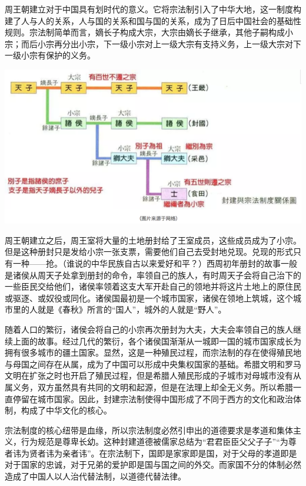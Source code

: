 \documentclass[
]{book}
\begin{document}
周王朝建立对于中国具有划时代的意义。它将宗法制引入了中华大地，这一制度构建了人与人的关系，人与国的关系和国与国的关系，成为了日后中国社会的基础性规则。宗法制简单而言，嫡长子构成大宗，大宗由嫡长子继承，其他子嗣构成小宗；而后小宗再分出小宗，下一级小宗对上一级大宗有支持义务，上一级大宗对下一级小宗有保护的义务。

\includegraphics[width=8.33in]{images/gx2}

周王朝建立之后，周王室将大量的土地册封给了王室成员，这些成员成为了小宗。但是这种册封只是发给小宗一张支票，需要他们自己去受封地兑现。兑现的形式只有一种------抢。（谁说的中华民族自古以来爱好和平？）西周初年册封的故事一般是诸侯从周天子处拿到册封的命令，率领自己的族人，有时周天子会将自己治下的一些臣民交给他们，诸侯率领着这支大军开赴自己的领地并将这片土地上的原住民或驱逐、或奴役或同化。诸侯国最初是一个城市国家，诸侯在领地上筑城，这个城市里的人就是《春秋》所言的``国人''，城外的人就是``野人''。

随着人口的繁衍，诸侯会将自己的小宗再次册封为大夫，大夫会率领自己的族人继续上面的故事。经过几代的繁衍，各个诸侯国渐渐从一城即一国的城市国家成长为拥有很多城市的疆土国家。显然，这是一种殖民过程，而宗法制的存在使得殖民地与母国之间存在从属，成为了中国可以形成中央集权国家的基础。希腊文明和罗马文明在扩张之时也开启了殖民过程，但是希腊人殖民形成的子城市对母城市没有从属义务，双方虽然具有共同的文明和起源，但是在法理上却全无义务。所以希腊一直停留在城市国家。因此，封建宗法制使得中国形成了不同于西方的文化和政治体制，构成了中华文化的核心。

宗法制度的核心纽带是血缘，所以宗法制度必然引申出的道德要求是孝道和集体主义，行为规范是尊卑长幼。这种封建道德被儒家总结为``君君臣臣父父子子''``为尊者讳为贤者讳为亲者讳''。在宗法制下，国即是家家即是国，对于父母的孝道即是对于国家的忠诚，对于兄弟的爱护即是国与国之间的外交。而家国不分的体制必然造成了中国人以人治代替法制，以道德代替法律。
\end{document}
